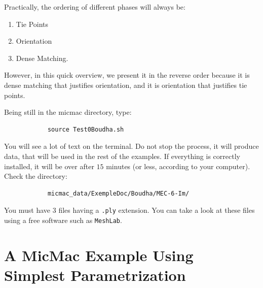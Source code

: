 Practically, the ordering of different phases will always be: %

\begin{enumerate}
	\item Tie Points
	\item Orientation
	\item Dense Matching.
\end{enumerate}

However, in this quick overview, we present it in the reverse
order because it is dense matching that justifies orientation, and it is orientation
that justifies tie points.

Being still in the micmac directory, type:

\begin{center}
\begin{verbatim}
            source Test0Boudha.sh 
\end{verbatim}
\end{center}

You will see a lot of text on the terminal. %
Do not stop the process, it will
produce data, that will be used in the rest of the examples.
If everything is correctly installed, it will be over after $15$ minutes
(or less, according to your computer). Check the directory:

\begin{center}
\begin{verbatim}
            micmac_data/ExempleDoc/Boudha/MEC-6-Im/
\end{verbatim}
\end{center}

You must have $3$ files  having a {\tt .ply} extension. You can take a look at these files
using a free software such as {\tt MeshLab}.





\section{A MicMac Example Using Simplest Parametrization}

